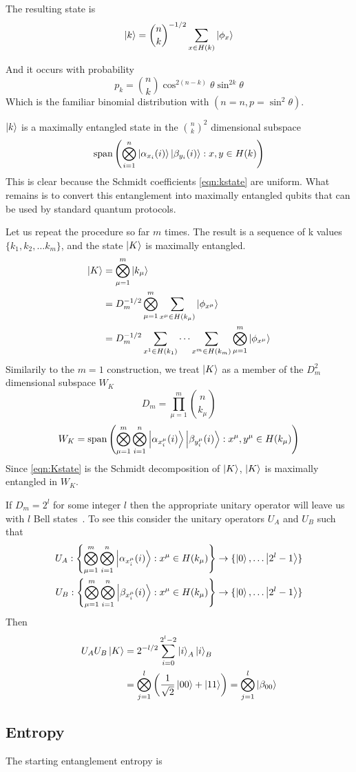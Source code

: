 The resulting state is
\begin{equation}
\label{eqn:kstate}
\ket{k} = \binom{n}{k}^{-1/2} \sum_{x \in H(k)} \ket{\phi_x}
\end{equation}

And it occurs with probability
$$
p_k = \binom{n}{k} \cos^{2(n-k)}\theta \sin^{2k}\theta
$$
Which is the familiar binomial distribution with $(n=n, p=\sin^2\theta)$.

$\ket{k}$ is a maximally entangled state in the $\binom{n}{k}^2$ dimensional subspace 
$$\text{span}\left(\bigotimes_{i=1}^n 
\ket{\alpha_{x_i}(i)} \ket{\beta_{y_i}(i)}: x,y \in H(k)\right)
$$
This is clear because the Schmidt coefficients \eqref{eqn:kstate} are uniform.
What remains is to convert this entanglement into maximally entangled qubits that can be used by standard quantum protocols. 

Let us repeat the procedure so far $m$ times. The result is a sequence of k values $\{k_1, k_2,\ldots k_m \}$, and the state
$\ket{K}$ is maximally entangled.
\begin{align}
\ket{K} &= \bigotimes_{\mu=1}^m \ket{k_\mu} \\
&= D_m^{-1/2} \bigotimes_{\mu=1}^m \sum_{x^\mu \in H(k_\mu)} \ket{\phi_{x^\mu}} \\
\label{eqn:Kstate}
&=  D_m^{-1/2} \sum_{x^1 \in H(k_1)} \cdots \sum_{x^m \in H(k_m)} \bigotimes_{\mu=1}^m  \ket{\phi_{x^\mu}}
\end{align}
Similarily to the $m=1$ construction, we treat $\ket{K}$ as a member of the $D_m^2$ dimensional subspace $W_K$
\begin{equation}
D_m = \prod_{\mu=1}^{m} \binom{n}{k_\mu}
\end{equation}
\begin{equation}
\label{eqn:Wk}
W_K = \text{span}\left(\bigotimes_{\mu=1}^m\bigotimes_{i=1}^n 
\ket{\alpha_{x_i^\mu}(i)} \ket{\beta_{y_i^\mu}(i)}: x^\mu,y^\mu \in H(k_\mu)\right)
\end{equation}
Since \eqref{eqn:Kstate} is the Schmidt decomposition of $\ket{K}$, $\ket{K}$ is maximally entangled in $W_K$.

If $D_m = 2^l$ for some integer $l$ then the appropriate unitary operator will leave us with $l$ Bell states~\cite{bennett1996concentrating}. To see this consider the unitary operators $U_A$ and $U_B$ such that
\begin{align}
U_A : \left\{
\bigotimes_{\mu=1}^m\bigotimes_{i=1}^n 
\ket{\alpha_{x_i^\mu}(i)}: x^\mu \in H(k_\mu) 
\right\} &\rightarrow \{\ket{0}, \ldots \ket{2^l-1
}\} \\
U_B :\left\{
\bigotimes_{\mu=1}^m\bigotimes_{i=1}^n 
\ket{\beta_{x_i^\mu}(i)}: x^\mu \in H(k_\mu) 
\right\} &\rightarrow \{\ket{0}, \ldots \ket{2^l-1
}\}
\end{align}
Then
\begin{align}
	U_A U_B \ket{K} &= 2^{-l/2}\sum_{i=0}^{2^l-2} \ket{i}_A\ket{i}_B\\
	&= \bigotimes_{j=1}^l \left( \frac{1}{\sqrt{2}} \ket{00} + \ket{11} \right) =
	 \bigotimes_{j=1}^l \ket{\beta_{00}}
\end{align}


\subsection{Entropy}
The starting entanglement entropy is

